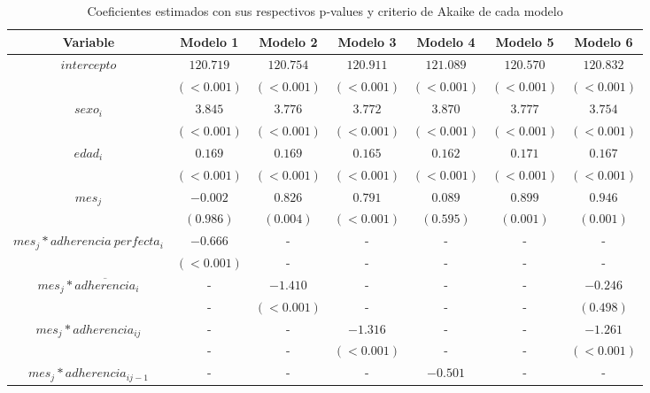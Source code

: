\documentclass[spanish]{article}
\numberwithin{figure}{subsection}
\numberwithin{equation}{subsection}
\numberwithin{table}{subsection}
\begin{document}
\begin{table}[H]
	\centering
	\caption{Coeficientes estimados con sus respectivos p-values y criterio de Akaike de cada modelo}
	\label{comparacion}
	\begin{tabular}{*{7}{|c}|}
		\hline
		Variable 						   				    & Modelo 1    & Modelo 2    & Modelo 3    & Modelo 4    & Modelo 5    & Modelo 6   \\
		\hline
		 	   				    & $120.719$   & $120.754$   & $120.911$   & $121.089$   & $120.570$   & $120.832$  \\
										   				    & $(<0.001)$  & $(<0.001)$  & $(<0.001)$  & $(<0.001)$  & $(<0.001)$  & $(<0.001)$ \\
		\hline
		 		   				    & $3.845$     & $3.776$     & $3.772$     & $3.870$     & $3.777$     & $3.754$    \\
										   				    & $(<0.001)$  & $(<0.001)$  & $(<0.001)$  & $(<0.001)$  & $(<0.001)$  & $(<0.001)$ \\
		\hline
				   				    & $0.169$     & $0.169$     & $0.165$     & $0.162$     & $0.171$     & $0.167$    \\
										   				    & $(<0.001)$  & $(<0.001)$  & $(<0.001)$  & $(<0.001)$  & $(<0.001)$  & $(<0.001)$ \\
		\hline
		 		   				    & $-0.002$    & $0.826$     & $0.791$     & $0.089$     & $0.899$     & $0.946$    \\
										   				    & $(0.986)$   & $(0.004)$   & $(<0.001)$  & $(0.595)$   & $(0.001)$   & $(0.001)$  \\
		\hline
		     & $-0.666$    & - 		    & - 		  & -		 	& - 		  & - 		   \\
														    & $(<0.001)$  & -			& - 		  & - 		    & - 		  & - 		   \\
		\hline
		    & -		 	  & $-1.410$    & - 		  & -           & - 		  & $-0.246$   \\
														    & - 		  & $(<0.001)$  & - 		  & - 			& - 		  & $(0.498)$  \\
		\hline
		            & -		 	  & -           & $-1.316$    & - 			& - 		  & $-1.261$   \\
														    & - 		  & - 		    & $(<0.001)$  & - 			& - 		  & $(<0.001)$ \\
		\hline
		 		    & - 		  & -           & - 		  & $-0.501$    & - 		  & - 		   \\

\end{tabular}
\end{table}
\end{document}
